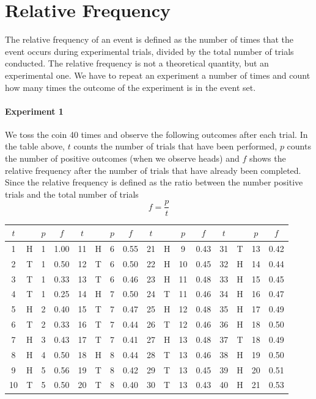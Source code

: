 \documentclass[a4paper,11pt]{report}
\begin{document}
\section{Relative Frequency}
The relative frequency of an event is defined as the number of times
that the event occurs during experimental trials, divided by the total
number of trials conducted. The relative frequency is not a
theoretical quantity, but an experimental one. We have to repeat an
experiment a number of times and count how many times the outcome of
the experiment is in the event set.

\paragraph{Experiment 1} We toss the coin 40 times and observe the
following outcomes after each trial. In the table above, $t$ counts
the number of trials that have been performed, $p$ counts the number
of positive outcomes (when we observe heads) and $f$ shows the
relative frequency after the number of trials that have already been
completed. Since the relative frequency is defined as the ratio
between the number positive trials and the total number of trials
\[f=\frac{p}{t}\]

\begin{tabular}{cccc|cccc|cccc|cccc}
  \toprule
  $t$ && $p$ & $f$  & $t$ && $p$ & $f$  & $t$ && $p$ & $f$  & $t$ && $p$ & $f$\\
  \midrule
  1 & H & 1 & 1.00 & 11 & H & 6 & 0.55 & 21 & H &  9 & 0.43 & 31 & T & 13 & 0.42\\
  2 & T & 1 & 0.50 & 12 & T & 6 & 0.50 & 22 & H & 10 & 0.45 & 32 & H & 14 & 0.44\\
  3 & T & 1 & 0.33 & 13 & T & 6 & 0.46 & 23 & H & 11 & 0.48 & 33 & H & 15 & 0.45\\
  4 & T & 1 & 0.25 & 14 & H & 7 & 0.50 & 24 & T & 11 & 0.46 & 34 & H & 16 & 0.47\\
  5 & H & 2 & 0.40 & 15 & T & 7 & 0.47 & 25 & H & 12 & 0.48 & 35 & H & 17 & 0.49\\
  6 & T & 2 & 0.33 & 16 & T & 7 & 0.44 & 26 & T & 12 & 0.46 & 36 & H & 18 & 0.50\\
  7 & H & 3 & 0.43 & 17 & T & 7 & 0.41 & 27 & H & 13 & 0.48 & 37 & T & 18 & 0.49\\
  8 & H & 4 & 0.50 & 18 & H & 8 & 0.44 & 28 & T & 13 & 0.46 & 38 & H & 19 & 0.50\\
  9 & H & 5 & 0.56 & 19 & T & 8 & 0.42 & 29 & T & 13 & 0.45 & 39 & H & 20 & 0.51\\
  10 & T & 5 & 0.50 & 20 & T & 8 & 0.40 & 30 & T & 13 & 0.43 & 40 & H & 21 & 0.53\\
  \bottomrule
\end{tabular}
\end{document}
